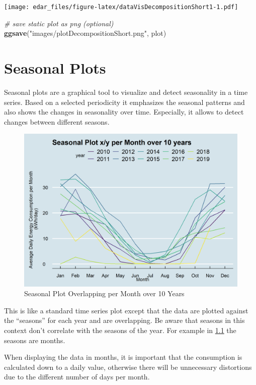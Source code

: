 \documentclass[
  a4paperpaper,
]{book}
\newenvironment{Shaded}{\begin{snugshade}}{\end{snugshade}}
\newcommand{\CommentTok}[1]{\textcolor[rgb]{0.56,0.35,0.01}{\textit{#1}}}
\newcommand{\KeywordTok}[1]{\textcolor[rgb]{0.13,0.29,0.53}{\textbf{#1}}}
\newcommand{\NormalTok}[1]{#1}
\newcommand{\StringTok}[1]{\textcolor[rgb]{0.31,0.60,0.02}{#1}}
\let\oldShaded\Shaded
\let\endoldShaded\endShaded
\renewenvironment{Shaded}{\footnotesize\oldShaded}{\endoldShaded}
\begin{document}
\texttt{[image: edar\_files/figure-latex/dataVisDecompositionShort1-1.pdf]}

\begin{Shaded}
\begin{Highlighting}[]
\CommentTok{# save static plot as png (optional)}
\KeywordTok{ggsave}\NormalTok{(}\StringTok{"images/plotDecompositionShort.png"}\NormalTok{, plot)}
\end{Highlighting}
\end{Shaded}

\hypertarget{seasonal-plots}{%
\chapter{Seasonal Plots}\label{seasonal-plots}}

Seasonal plots are a graphical tool to visualize and detect seasonality in a time series. Based on a selected periodicity it emphasizes the seasonal patterns and also shows the changes in seasonality over time. Especially, it allows to detect changes between different seasons.

\begin{figure}
\includegraphics[width=0.7\linewidth]{images/plotSeasonalXY} \caption{Seasonal Plot Overlapping per Month over 10 Years}\label{fig:figplotSeasonalXY}
\end{figure}

This is like a standard time series plot except that the data are plotted against the ``seasons'' for each year and are overlapping. Be aware that seasons in this context don't correlate with the seasons of the year. For example in \ref{fig:figplotSeasonalXY} the seasons are months.

When displaying the data in months, it is important that the consumption is calculated down to a daily value, otherwise there will be unnecessary distortions due to the different number of days per month.
\end{document}
